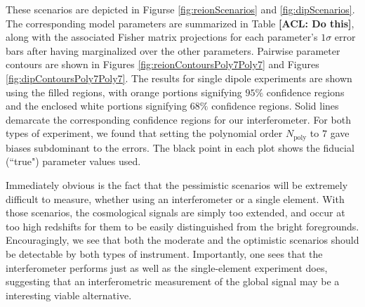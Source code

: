 \documentclass[twolcolumn,apj,iop,numberedappendix]{emulateapj}
\newcommand{\acl}[1]{{\color{red} \textbf{[ACL:  #1]}}}
\begin{document}
These scenarios are depicted in Figurse \ref{fig:reionScenarios} and  \ref{fig:dipScenarios}. The corresponding model parameters are summarized in Table \acl{Do this}, along with the associated Fisher matrix projections for each parameter's $1\sigma$ error bars after having marginalized over the other parameters. Pairwise parameter contours are shown in Figures \ref{fig:reionContoursPoly7Poly7} and Figures \ref{fig:dipContoursPoly7Poly7}. The results for single dipole experiments are shown using the filled regions, with orange portions signifying $95\%$ confidence regions and the enclosed white portions signifying $68\%$ confidence regions. Solid lines demarcate the corresponding confidence regions for our interferometer. For both types of experiment, we found that setting the polynomial order $N_\textrm{poly}$ to $7$ gave biases subdominant to the errors. The black point in each plot shows the fiducial (``true") parameter values used.

Immediately obvious is the fact that the pessimistic scenarios will be extremely difficult to measure, whether using an interferometer or a single element. 
With those scenarios, the cosmological signals are simply too extended, and occur at too high redshifts for them to be easily distinguished from the bright foregrounds. Encouragingly, we see that both the moderate and the optimistic scenarios should be detectable by both types of instrument. Importantly, one sees that the interferometer performs just as well as the single-element experiment does, suggesting that an interferometric measurement of the global signal may be a interesting viable alternative.
\end{document}
